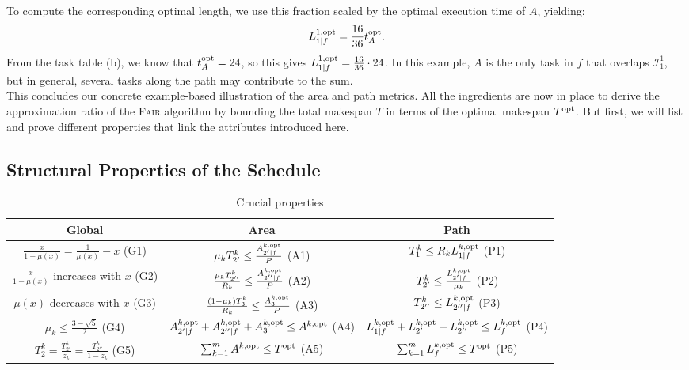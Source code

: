 \documentclass{article}
\newcommand\opt{\textnormal{opt}\xspace}
\begin{document}
To compute the corresponding optimal length, we use this fraction scaled by the optimal execution time of \( A \), yielding:
\[
L_{1|f}^{1,\opt} = \frac{16}{36} t_A^{\opt}.
\]
From the task table (b), we know that \( t_A^{\opt} = 24 \), so this gives \( L_{1|f}^{1,\opt} = \frac{16}{36} \cdot 24 \). In this example, \( A \) is the only task in \( f \) that overlaps \(\mathcal{I}_1^1\), but in general, several tasks along the path may contribute to the sum.\\


This concludes our concrete example-based illustration of the area and path metrics. All the ingredients are now in place to derive the approximation ratio of the \textsc{Fair} algorithm by bounding the total makespan \( T \) in terms of the optimal makespan \( T^{\opt} \). But first, we will list and prove different properties that link the attributes introduced here.




\subsection{Structural Properties of the Schedule}
\begin{table}[h]
\centering
\caption{Crucial properties}
\label{tab.prop}
\renewcommand{\arraystretch}{2}
\begin{tabular}{|c|c|c|}
\hline
\textbf{Global} & \textbf{Area} & \textbf{Path} \\
\hline
\(\frac{x}{1-\mu(x)} = \frac{1}{\mu(x)} - x\) \hfill (G1) & \(\mu_k T_{2'}^k \leq \frac{A_{2'|f}^{k,\opt}}{P}\) \hfill (A1) & \(T_1^k \leq R_k L_{1|f}^{k,\opt}\) \hfill (P1) \\
\hline
\(\frac{x}{1-\mu(x)}\) increases with \(x\) \hfill  (G2) & \(\frac{\mu_k T_{2''}^k}{R_k} \leq \frac{A_{2''|f}^{k,\opt}}{P}\) \hfill (A2) & \(T_{2'}^k \leq \frac{L_{2'|f}^{k,\opt}}{\mu_k}\) \hfill (P2) \\
\hline
\(\mu(x)\) decreases with \(x\) \hfill(G3) & \(\frac{(1 - \mu_k) T_3^k}{R_k} \leq \frac{A_3^{k,\opt}}{P}\) \hfill (A3) & \(T_{2''}^k \leq L_{2''|f}^{k,\opt}\) \hfill (P3) \\
\hline
\(\mu_k \leq \frac{3 - \sqrt{5}}{2}\)
 \hfill (G4) & \(A_{2'|f}^{k,\opt} + A_{2''|f}^{k,\opt} + A_3^{k,\opt} \leq A^{k,\opt}\) \hfill (A4) & \(L_{1|f}^{k,\opt} + L_{2'}^{k,\opt} + L_{2''}^{k,\opt} \leq L_f^{k,\opt}\) \hfill (P4) \\
\hline
\(T_2^k = \frac{T_{2'}^k}{z_k} = \frac{T_{2''}^k}{1 - z_k}\) \hfill (G5) & \(\sum_{k=1}^m A^{k,\opt} \leq T^{\opt}\) \hfill (A5) & \(\sum_{k=1}^m L_f^{k,\opt} \leq T^{\opt}\) \hfill (P5) \\
\hline
\end{tabular}
\end{table}
\end{document}
